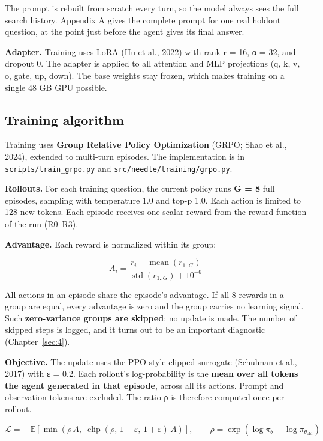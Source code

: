 The prompt is rebuilt from scratch every turn, so the model always sees
the full search history. Appendix A gives the complete prompt for one
real holdout question, at the point just before the agent gives its
final answer.

\textbf{Adapter.} Training uses LoRA (Hu et al., 2022) with rank r = 16,
α = 32, and dropout 0. The adapter is applied to all attention and MLP
projections (q, k, v, o, gate, up, down). The base weights stay frozen,
which makes training on a single 48 GB GPU possible.

\subsection{Training algorithm}\label{sec:3.6}

Training uses \textbf{Group Relative Policy Optimization} (GRPO; Shao et
al., 2024), extended to multi-turn episodes. The implementation is in
\texttt{scripts/\allowbreak{}train\_\allowbreak{}grpo.\allowbreak{}py}
and
\texttt{src/\allowbreak{}needle/\allowbreak{}training/\allowbreak{}grpo.\allowbreak{}py}.

\textbf{Rollouts.} For each training question, the current policy runs
\textbf{G = 8} full episodes, sampling with temperature 1.0 and top-p
1.0. Each action is limited to 128 new tokens. Each episode receives one
scalar reward from the reward function of the run (R0--R3).

\textbf{Advantage.} Each reward is normalized within its group:

\[
A_i = \frac{r_i - \operatorname{mean}(r_{1..G})}{\operatorname{std}(r_{1..G}) + 10^{-6}}
\]

All actions in an episode share the episode's advantage. If all 8
rewards in a group are equal, every advantage is zero and the group
carries no learning signal. Such \textbf{zero-variance groups are
skipped}: no update is made. The number of skipped steps is logged, and
it turns out to be an important diagnostic (Chapter~\ref{sec:4}).

\textbf{Objective.} The update uses the PPO-style clipped surrogate
(Schulman et al., 2017) with ε = 0.2. Each rollout's log-probability is
the \textbf{mean over all tokens the agent generated in that episode},
across all its actions. Prompt and observation tokens are excluded. The
ratio ρ is therefore computed once per rollout.

\[
\mathcal{L} = -\,\mathbb{E}\left[\min\left(\rho\,A,\; \operatorname{clip}(\rho,\,1-\varepsilon,\,1+\varepsilon)\,A\right)\right],
\qquad \rho = \exp\left(\log\pi_\theta - \log\pi_{\theta_\text{old}}\right)
\]

